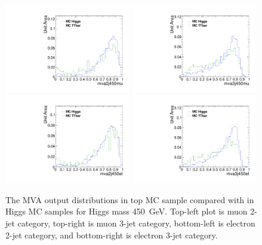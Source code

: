 \begin{figure}[!t]
  \centering
  \includegraphics[width=0.49\textwidth]{figs/cl-mva2j450mu-mvaTopvsHiggs.pdf}
  \includegraphics[width=0.49\textwidth]{figs/cl-mva3j450mu-mvaTopvsHiggs.pdf}
  \includegraphics[width=0.49\textwidth]{figs/cl-mva2j450el-mvaTopvsHiggs.pdf}
  \includegraphics[width=0.49\textwidth]{figs/cl-mva3j450el-mvaTopvsHiggs.pdf}
  \caption{\label{fig:mva:sigvsttbar-mva2j450}The MVA output
    distributions in top MC sample compared with in Higgs MC
    samples for Higgs mass 450~GeV. Top-left plot is muon 2-jet category,
    top-right is muon 3-jet category, bottom-left is electron 2-jet
    category, and bottom-right is electron 3-jet category. }
\end{figure}

